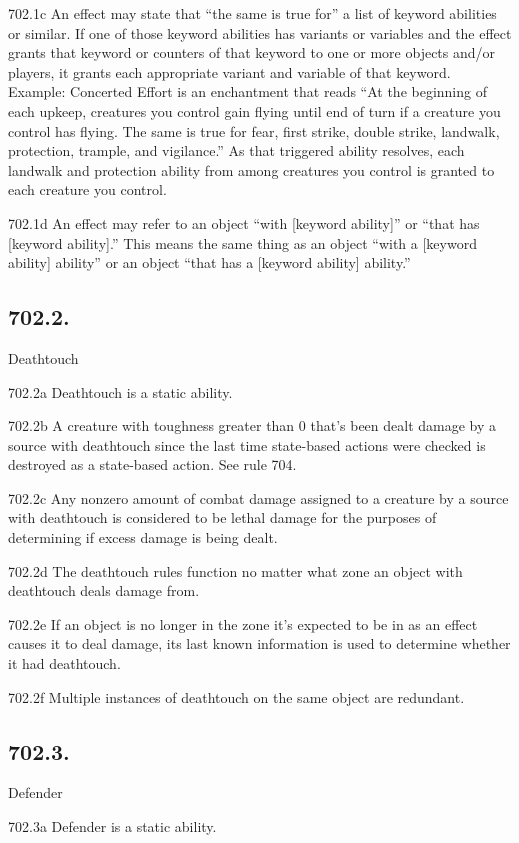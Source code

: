702.1c An effect may state that “the same is true for” a list of keyword abilities or similar. If one of those keyword abilities has variants or variables and the effect grants that keyword or counters of that keyword to one or more objects and/or players, it grants each appropriate variant and variable of that keyword.
Example: Concerted Effort is an enchantment that reads “At the beginning of each upkeep, creatures you control gain flying until end of turn if a creature you control has flying. The same is true for fear, first strike, double strike, landwalk, protection, trample, and vigilance.” As that triggered ability resolves, each landwalk and protection ability from among creatures you control is granted to each creature you control.

702.1d An effect may refer to an object “with [keyword ability]” or “that has [keyword ability].” This means the same thing as an object “with a [keyword ability] ability” or an object “that has a [keyword ability] ability.”

\subsection*{702.2.}
Deathtouch

702.2a Deathtouch is a static ability.

702.2b A creature with toughness greater than 0 that’s been dealt damage by a source with deathtouch since the last time state-based actions were checked is destroyed as a state-based action. See rule 704.

702.2c Any nonzero amount of combat damage assigned to a creature by a source with deathtouch is considered to be lethal damage for the purposes of determining if excess damage is being dealt.

702.2d The deathtouch rules function no matter what zone an object with deathtouch deals damage from.

702.2e If an object is no longer in the zone it’s expected to be in as an effect causes it to deal damage, its last known information is used to determine whether it had deathtouch.

702.2f Multiple instances of deathtouch on the same object are redundant.

\subsection*{702.3.}
Defender

702.3a Defender is a static ability.

